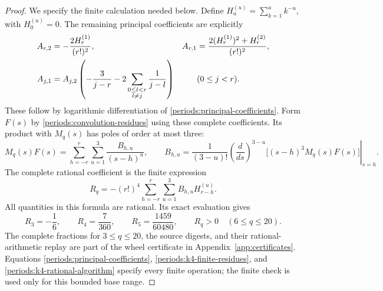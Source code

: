 \begin{proof}
We specify the finite calculation needed below.  Define
$H_a^{(u)}=\sum_{k=1}^{a}k^{-u}$, with $H_0^{(u)}=0$.
The remaining principal coefficients are explicitly
\begin{align}
 A_{r,2}&=-\frac{2H_r^{(1)}}{(r!)^2},&
 A_{r,1}&=\frac{2(H_r^{(1)})^2+H_r^{(2)}}{(r!)^2},\notag\\
 A_{j,1}&=A_{j,2}\left(-\frac3{j-r}
 -2\sum_{\substack{0\le l<r\\l\ne j}}\frac1{j-l}\right)
 &&(0\le j<r).
 \label{periods:k4-lower-principal}
\end{align}
These follow by logarithmic differentiation of
\eqref{periods:principal-coefficients}.  Form $F(s)$ by
\eqref{periods:convolution-residues} using these complete coefficients.
Its product with
$M_q(s)$ has poles of order at most three:
\begin{equation}
 M_q(s)F(s)=\sum_{h=-r}^{r}\sum_{u=1}^{3}\frac{B_{h,u}}{(s-h)^u},
 \qquad
 B_{h,u}=\left.\frac1{(3-u)!}
 \left(\frac{d}{ds}\right)^{3-u}
 \bigl[(s-h)^3M_q(s)F(s)\bigr]\right|_{s=h}.
 \label{periods:k4-finite-residues}
\end{equation}
The complete rational coefficient is the finite expression
\begin{equation}
 R_q=-(r!)^4\sum_{h=-r}^{r}\sum_{u=1}^{3}B_{h,u}H_{r-h}^{(u)}.
 \label{periods:k4-rational-algorithm}
\end{equation}
All quantities in this formula are rational.  Its exact evaluation gives
\begin{equation}
 R_3=-\frac16,\qquad R_4=\frac7{360},\qquad
 R_5=\frac{1459}{60480},\qquad R_q>0\quad(6\le q\le20).
 \label{periods:k4-finite-base}
\end{equation}
The complete fractions for $3\le q\le20$, the source digests, and their
rational-arithmetic replay are part of the wheel certificate in
Appendix~\ref{app:certificates}.  Equations
\eqref{periods:principal-coefficients},
\eqref{periods:k4-finite-residues}, and
\eqref{periods:k4-rational-algorithm} specify every finite operation;
the finite check is used only for this bounded base range.


\end{proof}
